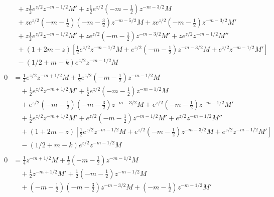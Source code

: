 \documentclass[a4paper,10pt, leqno, answers]{exam}  %
\begin{document}
\begin{questions}
\begin{solution}
\begin{align*}
\begin{split}
                &\quad {}+ z \frac{1}{2} e^{z/2} z^{-m - 1/2} M' + z \frac{1}{2} e^{z/2} \left( -m - \frac{1}{2} \right)  z^{-m - 3/2} M \\
                &\quad {}+ z e^{z/2} \left( -m - \frac{1}{2} \right) \left( -m - \frac{3}{2} \right) z^{-m - 5/2} M + z e^{z/2} \left( -m - \frac{1}{2} \right) z^{-m - 3/2} M' \\
                &\quad {}+ z \frac{1}{2} e^{z/2} z^{-m - 1/2} M' + z e^{z/2} \left( -m - \frac{1}{2} \right) z^{-m - 3/2} M' + z e^{z/2} z^{-m - 1/2} M'' \\
                &\quad {}+ (1 + 2 m - z) \left[ \frac{1}{2} e^{z/2} z^{-m - 1/2} M + e^{z/2} \left( -m - \frac{1}{2} \right) z^{-m - 3/2} M + e^{z/2} z^{-m - 1/2} M' \right] \\
                &\quad {}- (1/2 + m - k) e^{z/2} z^{-m - 1/2} M
            \end{split} \\
            \begin{split}
                0 &= \frac{1}{4} e^{z/2} z^{-m + 1/2} M + \frac{1}{2} e^{z/2} \left( -m - \frac{1}{2} \right) z^{-m - 1/2} M \\
                &\quad {}+ \frac{1}{2} e^{z/2} z^{-m + 1/2} M' + \frac{1}{2} e^{z/2} \left( -m - \frac{1}{2} \right) z^{-m - 1/2} M \\
                &\quad {}+ e^{z/2} \left( -m - \frac{1}{2} \right) \left( -m - \frac{3}{2} \right) z^{-m - 3/2} M + e^{z/2} \left( -m - \frac{1}{2} \right) z^{-m - 1/2} M' \\
                &\quad {}+ \frac{1}{2} e^{z/2} z^{-m + 1/2} M' + e^{z/2} \left( -m - \frac{1}{2} \right) z^{-m - 1/2} M' + e^{z/2} z^{-m + 1/2} M'' \\
                &\quad {}+ (1 + 2 m - z) \left[ \frac{1}{2} e^{z/2} z^{-m - 1/2} M + e^{z/2} \left( -m - \frac{1}{2} \right) z^{-m - 3/2} M + e^{z/2} z^{-m - 1/2} M' \right] \\
                &\quad {}- (1/2 + m - k) e^{z/2} z^{-m - 1/2} M
            \end{split} \\
            \begin{split}
                0 &= \frac{1}{4} z^{-m + 1/2} M + \frac{1}{2} \left( -m - \frac{1}{2} \right) z^{-m - 1/2} M \\
                &\quad {}+ \frac{1}{2} z^{-m + 1/2} M' + \frac{1}{2} \left( -m - \frac{1}{2} \right) z^{-m - 1/2} M \\
                &\quad {}+ \left( -m - \frac{1}{2} \right) \left( -m - \frac{3}{2} \right) z^{-m - 3/2} M + \left( -m - \frac{1}{2} \right) z^{-m - 1/2} M' \\

\end{split}
\end{align*}
\end{solution}
\end{questions}
\end{document}
